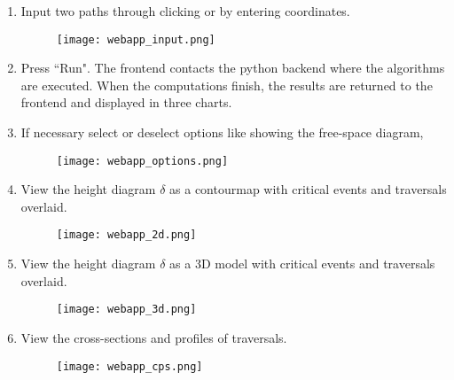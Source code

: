 \begin{enumerate}
	\item Input two paths through clicking or by entering coordinates.
	
	\begin{figure}[H]
		\centering
		\texttt{[image: webapp\_input.png]}
	\end{figure}
	
	\item Press ``Run". The frontend contacts the python backend where the algorithms are executed. When the computations finish, the results are returned to the frontend and displayed in three charts.

	\item If necessary select or deselect options like showing the free-space diagram, 
	
	\begin{figure}[H]
		\centering
		\texttt{[image: webapp\_options.png]}
	\end{figure}
	
	\item View the height diagram $\delta$ as a contourmap with critical events and traversals overlaid.
	
	
	\begin{figure}[H]
		\centering
		\texttt{[image: webapp\_2d.png]}
	\end{figure}
	
	\item View the height diagram $\delta$ as a 3D model with critical events and traversals overlaid.
	
	\begin{figure}[H]
		\centering
		\texttt{[image: webapp\_3d.png]}
	\end{figure}
	
	\item View the cross-sections and profiles of traversals.
	
	\begin{figure}[H]
		\centering
		\texttt{[image: webapp\_cps.png]}
	\end{figure}
	
	
	
\end{enumerate}


